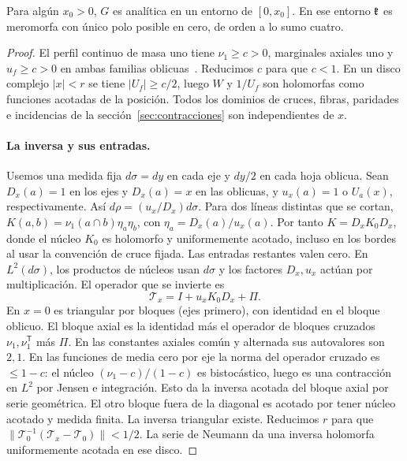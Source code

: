 \begin{lema}\label{lem:regularidad-extremo}
Para algún \(x_0>0\), \(G\) es analítica en un entorno de \([0,x_0]\).
En ese entorno \(\mathfrak{k}\) es meromorfa con único polo posible en cero, de orden a lo sumo cuatro.
\end{lema}
\begin{proof}
El perfil continuo de masa uno tiene \(\nu_1\ge c>0\), marginales axiales uno y
\(u_f\ge c>0\) en ambas familias oblicuas~\cite{pv}. Reducimos \(c\) para que \(c<1\).
En un disco complejo \(|x|<r\) se tiene \(|U_f|\ge c/2\), luego \(W\) y \(1/U_f\)
son holomorfas como funciones acotadas de la posición. Todos los dominios de cruces, fibras,
paridades e incidencias de la sección~\ref{sec:contracciones} son independientes de \(x\).

\paragraph{La inversa y sus entradas.}
Usemos una medida fija \(d\sigma=dy\) en cada eje y \(dy/2\) en cada hoja oblicua. Sean
\(D_x(a)=1\) en los ejes y \(D_x(a)=x\) en las oblicuas, y \(u_x(a)=1\) o \(U_a(x)\),
respectivamente. Así \(d\rho=(u_x/D_x)d\sigma\). Para dos líneas distintas que se cortan,
\(K(a,b)=\nu_1(a\cap b)\eta_a\eta_b\), con \(\eta_a=D_x(a)/u_x(a)\).
Por tanto \(K=D_x K_0 D_x\), donde el núcleo \(K_0\) es holomorfo y uniformemente
acotado, incluso en los bordes al usar la convención de cruce fijada. Las entradas restantes
valen cero. En \(L^2(d\sigma)\), los productos de núcleos usan \(d\sigma\) y los factores
\(D_x,u_x\) actúan por multiplicación. El operador que se invierte es
\[
 \mathcal T_x=I+u_x K_0D_x+\Pi .
\]
En \(x=0\) es triangular por bloques (ejes primero), con identidad en el bloque oblicuo.
El bloque axial es la identidad más el operador de bloques cruzados \(\nu_1,\nu_1^{\mathsf T}\)
más \(\Pi\). En las constantes axiales común y alternada sus autovalores son \(2,1\).
En las funciones de media cero por eje la norma del operador cruzado es \(\le1-c\):
el núcleo \((\nu_1-c)/(1-c)\) es bistocástico, luego es una contracción en \(L^2\)
por Jensen e integración. Esto da la inversa acotada del bloque axial por serie geométrica.
El otro bloque fuera de la diagonal es acotado por tener núcleo acotado y medida finita.
La inversa triangular existe. Reducimos \(r\) para que
\(\|\mathcal T_0^{-1}(\mathcal T_x-\mathcal T_0)\|<1/2\). La serie de Neumann da
una inversa holomorfa uniformemente acotada en ese disco.


\end{proof}
